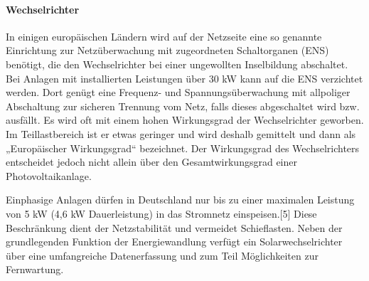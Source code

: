 \paragraph{Wechselrichter}
In einigen europäischen Ländern wird auf der Netzseite eine so genannte Einrichtung zur Netzüberwachung mit zugeordneten Schaltorganen (ENS) benötigt, die den Wechselrichter bei einer ungewollten Inselbildung abschaltet. Bei Anlagen mit installierten Leistungen über 30 \si{kW} kann auf die ENS verzichtet werden. Dort genügt eine Frequenz- und Spannungsüberwachung mit allpoliger Abschaltung zur sicheren Trennung vom Netz, falls dieses abgeschaltet wird bzw. ausfällt. 
Es wird oft mit einem hohen Wirkungsgrad der Wechselrichter geworben. Im Teillastbereich ist er etwas geringer und wird deshalb gemittelt und dann als „Europäischer Wirkungsgrad“ bezeichnet. Der Wirkungsgrad des Wechselrichters entscheidet jedoch nicht allein über den Gesamtwirkungsgrad einer Photovoltaikanlage. 
\iffalse
Seit Januar 2009 müssen Photovoltaikanlagen in Deutschland mit installierten Leistungen ab 100 \si{kW} über die Möglichkeit verfügen, vom Netzbetreiber in der eingespeisten Wirkleistung reduziert zu werden (§ 6.1 EEG). Des Weiteren besteht die Möglichkeit, dass eine bestimmte Menge Blindleistung zur Verfügung gestellt wird. In der Praxis werden diese Vorgaben dynamisch über Rundsteuerempfänger realisiert, die eine vierstufige Wirkleistungsreduzierung signalisieren können bzw. einen von 1 abweichenden Wirkfaktor von beispielsweise $\cos \phi = 0,95$ (induktiv) vorgeben. Durch die Bereitstellung von induktiver Blindleistung können kapazitiv bedingte Überspannungen vermieden werden.[3] 
Ab Juli 2011 müssen auch kleinere Anlagen im Niederspannungsnetz vergleichbare Regelfunktionen anbieten.[4] Landestypische weitergehende Vorschriften führen zu Lieferengpässen und höheren Erzeugungskosten. Gegenkonzepte wie Net Metering verfolgen einen unkomplizierteren Ansatz und verlagern die Problematik auf den Netzbetreiber. 
Bei größeren Anlagen, bei welchen unter anderem die Mittelspannungsrichtlinie einzuhalten ist, sind weitere Maßnahmen zu dynamischen Netzstabilisierung wie die Fähigkeit zu Low-Voltage Ride Through vorgeschrieben. Die Maßnahmen dienen dazu um eine ungewollte und gleichzeitige Abschaltung vieler Anlagen bei kurzzeitiger lokaler Unterspannung, wie sie im Rahmen von Kürzschlüssen oder anderen Fehlern im Drehstromsystemen vorkommen, zu vermeiden. 
\fi
Einphasige Anlagen dürfen in Deutschland nur bis zu einer maximalen Leistung von 5 \si{kW} (4,6 \si{kW} Dauerleistung) in das Stromnetz einspeisen.[5] Diese Beschränkung dient der Netzstabilität und vermeidet Schieflasten. Neben der grundlegenden Funktion der Energiewandlung verfügt ein Solarwechselrichter über eine umfangreiche Datenerfassung und zum Teil Möglichkeiten zur Fernwartung. 



